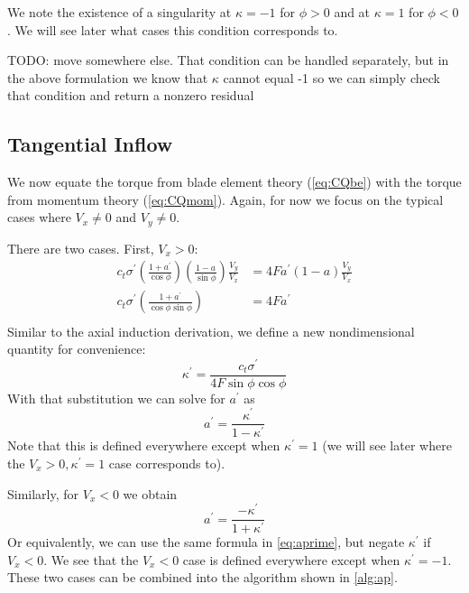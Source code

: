 \documentclass{article}
\begin{document}
We note the existence of a singularity at $\kappa = -1$ for $\phi > 0$ and at $\kappa = 1$ for $\phi < 0$.  We will see later what cases this condition corresponds to.

TODO: move somewhere else.  That condition can be handled separately, but in the above formulation we know that $\kappa$ cannot equal -1 so we can simply check that condition and return a nonzero residual

\subsection{Tangential Inflow}

We now equate the torque from blade element theory (\cref{eq:CQbe}) with the torque from momentum theory (\cref{eq:CQmom}).  Again, for now we focus on the typical cases where $V_x \ne 0$ and $V_y \ne 0$.

There are two cases.  First, $V_x > 0$:
\begin{equation}
\begin{aligned}
 c_t \sigma^\prime \left(\frac{1 + a^\prime}{\cos\phi}\right)\left(\frac{1 - a}{\sin\phi}\right)\frac{V_y}{V_x} &= 4 F a^\prime (1 - a) \frac{V_y}{V_x}\\
 c_t \sigma^\prime \left(\frac{1 + a^\prime}{\cos\phi\sin\phi}\right)&= 4 F a^\prime \\
\end{aligned}
\end{equation}
Similar to the axial induction derivation, we define a new nondimensional quantity for convenience:
\begin{equation}
    \kappa^\prime = \frac{c_t \sigma^\prime}{4 F \sin\phi \cos\phi}
\end{equation}
With that substitution we can solve for $a^\prime$ as
\begin{equation}
    a^\prime = \frac{\kappa^\prime}{1 - \kappa^\prime}
    \label{eq:aprime}
\end{equation}
Note that this is defined everywhere except when $\kappa^\prime = 1$ (we will see later where the $V_x > 0, \kappa^\prime = 1$ case corresponds to).

Similarly, for $V_x < 0$ we obtain
\begin{equation}
    a^\prime = \frac{-\kappa^\prime}{1 + \kappa^\prime}
\end{equation}
Or equivalently, we can use the same formula in \cref{eq:aprime}, but negate $\kappa^\prime$ if $V_x < 0$.  We see that the $V_x < 0$ case is defined everywhere except when $\kappa^\prime = -1$.  These two cases can be combined into the algorithm shown in \cref{alg:ap}.
\end{document}
